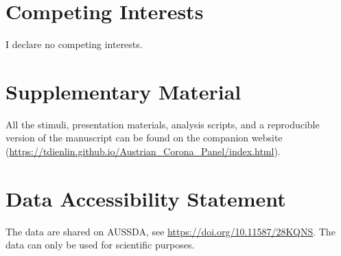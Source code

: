 \documentclass[
  english,
  man,mask,floatsintext]{apa6}
\begin{document}
\newpage

\hypertarget{competing-interests}{%
\section{Competing Interests}\label{competing-interests}}

I declare no competing interests.

\hypertarget{supplementary-material}{%
\section{Supplementary Material}\label{supplementary-material}}

All the stimuli, presentation materials, analysis scripts, and a reproducible version of the manuscript can be found on the companion website (\url{https://tdienlin.github.io/Austrian_Corona_Panel/index.html}).

\hypertarget{data-accessibility-statement}{%
\section{Data Accessibility Statement}\label{data-accessibility-statement}}

The data are shared on AUSSDA, see \url{https://doi.org/10.11587/28KQNS}.
The data can only be used for scientific purposes.
\end{document}
